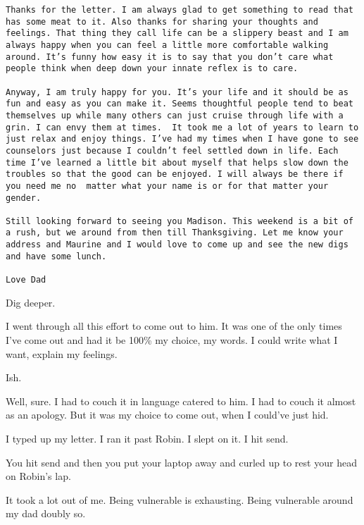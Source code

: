 \begin{paracol}{2}
\begin{leftcolumn}
\begin{verbatim}
Thanks for the letter. I am always glad to get something to read that has some meat to it. Also thanks for sharing your thoughts and feelings. That thing they call life can be a slippery beast and I am always happy when you can feel a little more comfortable walking around. It’s funny how easy it is to say that you don’t care what people think when deep down your innate reflex is to care.

Anyway, I am truly happy for you. It’s your life and it should be as fun and easy as you can make it. Seems thoughtful people tend to beat themselves up while many others can just cruise through life with a grin. I can envy them at times.  It took me a lot of years to learn to just relax and enjoy things. I’ve had my times when I have gone to see counselors just because I couldn’t feel settled down in life. Each time I’ve learned a little bit about myself that helps slow down the troubles so that the good can be enjoyed. I will always be there if you need me no  matter what your name is or for that matter your gender.

Still looking forward to seeing you Madison. This weekend is a bit of a rush, but we around from then till Thanksgiving. Let me know your address and Maurine and I would love to come up and see the new digs and have some lunch.

Love Dad
\end{verbatim}

\begin{ally}
Dig deeper.
\end{ally}
\newpage

I went through all this effort to come out to him. It was one of the only times I've come out and had it be 100\% my choice, my words. I could write what I want, explain my feelings.

\begin{ally}
Ish.
\end{ally}
Well, sure. I had to couch it in language catered to him. I had to couch it almost as an apology. But it was my choice to come out, when I could've just hid.

I typed up my letter. I ran it past Robin. I slept on it. I hit send.

\begin{ally}
You hit send and then you put your laptop away and curled up to rest your head on Robin's lap.
\end{ally}
It took a lot out of me. Being vulnerable is exhausting. Being vulnerable around my dad doubly so.


\end{leftcolumn}
\end{paracol}
